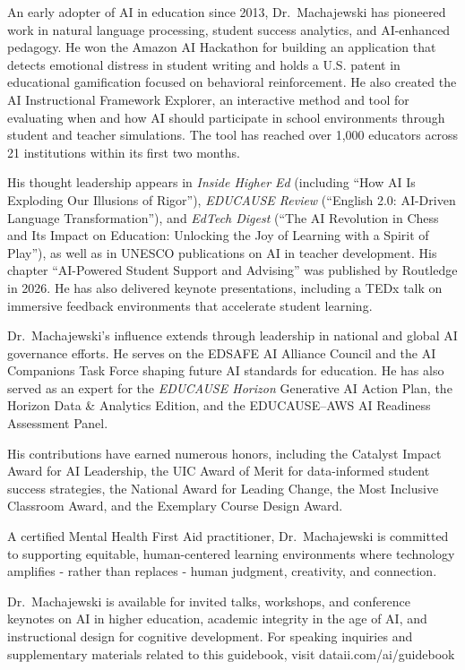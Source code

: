 \documentclass[
  letterpaper,
  DIV=11,
  numbers=noendperiod]{scrreprt}
\begin{document}
An early adopter of AI in education since 2013, Dr.~Machajewski has
pioneered work in natural language processing, student success
analytics, and AI-enhanced pedagogy. He won the Amazon AI Hackathon for
building an application that detects emotional distress in student
writing and holds a U.S. patent in educational gamification focused on
behavioral reinforcement. He also created the AI Instructional Framework
Explorer, an interactive method and tool for evaluating when and how AI
should participate in school environments through student and teacher
simulations. The tool has reached over 1,000 educators across 21
institutions within its first two months.

His thought leadership appears in \emph{Inside Higher Ed} (including
``How AI Is Exploding Our Illusions of Rigor''), \emph{EDUCAUSE Review}
(``English 2.0: AI-Driven Language Transformation''), and \emph{EdTech
Digest} (``The AI Revolution in Chess and Its Impact on Education:
Unlocking the Joy of Learning with a Spirit of Play''), as well as in
UNESCO publications on AI in teacher development. His chapter
``AI-Powered Student Support and Advising'' was published by Routledge
in 2026. He has also delivered keynote presentations, including a TEDx
talk on immersive feedback environments that accelerate student
learning.

Dr.~Machajewski's influence extends through leadership in national and
global AI governance efforts. He serves on the EDSAFE AI Alliance
Council and the AI Companions Task Force shaping future AI standards for
education. He has also served as an expert for the \emph{EDUCAUSE
Horizon} Generative AI Action Plan, the Horizon Data \& Analytics
Edition, and the EDUCAUSE--AWS AI Readiness Assessment Panel.

His contributions have earned numerous honors, including the Catalyst
Impact Award for AI Leadership, the UIC Award of Merit for data-informed
student success strategies, the National Award for Leading Change, the
Most Inclusive Classroom Award, and the Exemplary Course Design Award.

A certified Mental Health First Aid practitioner, Dr.~Machajewski is
committed to supporting equitable, human-centered learning environments
where technology amplifies - rather than replaces - human judgment,
creativity, and connection.

Dr.~Machajewski is available for invited talks, workshops, and
conference keynotes on AI in higher education, academic integrity in the
age of AI, and instructional design for cognitive development. For
speaking inquiries and supplementary materials related to this
guidebook, visit dataii.com/ai/guidebook
\end{document}
